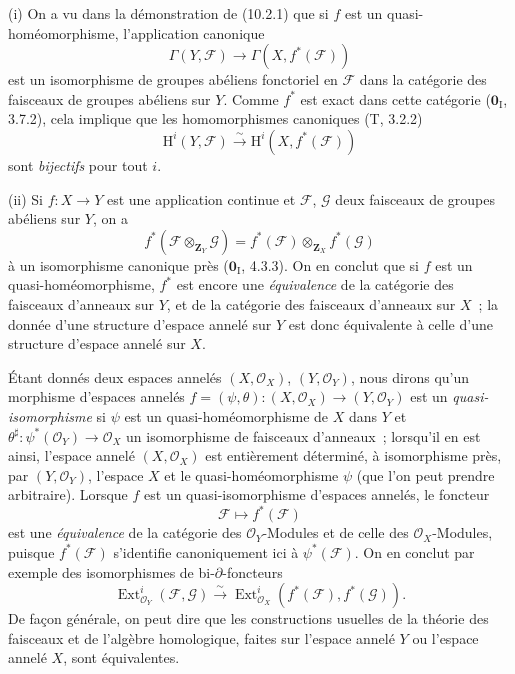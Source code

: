 \begin{remarks}[10.2.8]
\label{IV.10.2.8-fr}
\upshape (i) On a vu dans la démonstration de (10.2.1) que si $f$ est un
quasi-homéomorphisme, l'application canonique
\begin{equation}
\label{IV.10.2.8.1-fr}
\tag{10.2.8.1}
\Gamma(Y,\mathcal F)\to\Gamma(X,f^*(\mathcal F))
\end{equation}
est un isomorphisme de groupes abéliens fonctoriel en $\mathcal F$ dans la
catégorie des faisceaux de groupes abéliens sur $Y$. Comme $f^*$ est exact
dans cette catégorie ($\mathbf 0_{\mathrm I}$, 3.7.2), cela implique que les
homomorphismes canoniques (T, 3.2.2)
\[
\mathrm H^i(Y,\mathcal F)\xrightarrow{\sim}
\mathrm H^i(X,f^*(\mathcal F))
\]
sont \emph{bijectifs} pour tout $i$.

(ii) Si $f:X\to Y$ est une application continue et $\mathcal F$,
$\mathcal G$ deux faisceaux de groupes abéliens sur $Y$, on a
\[
f^*(\mathcal F\otimes_{\mathbf Z_Y}\mathcal G)
=f^*(\mathcal F)\otimes_{\mathbf Z_X}f^*(\mathcal G)
\]
à un isomorphisme canonique près ($\mathbf 0_{\mathrm I}$, 4.3.3). On en
conclut que si $f$ est un quasi-homéomorphisme, $f^*$ est encore une
\emph{équivalence} de la catégorie des faisceaux d'anneaux sur $Y$, et de la
catégorie des faisceaux d'anneaux sur $X$~; la donnée d'une structure d'espace
annelé sur $Y$ est donc équivalente à celle d'une structure d'espace annelé
sur $X$.

Étant donnés deux espaces annelés $(X,\mathcal O_X)$, $(Y,\mathcal O_Y)$, nous
dirons qu'un morphisme d'espaces annelés
$f=(\psi,\theta):(X,\mathcal O_X)\to(Y,\mathcal O_Y)$ est un
\emph{quasi-isomorphisme} si $\psi$ est un quasi-homéomorphisme de $X$ dans
$Y$ et $\theta^\sharp:\psi^*(\mathcal O_Y)\to\mathcal O_X$ un isomorphisme de
faisceaux d'anneaux~; lorsqu'il en est ainsi, l'espace annelé
$(X,\mathcal O_X)$ est entièrement déterminé, à isomorphisme près, par
$(Y,\mathcal O_Y)$, l'espace $X$ et le quasi-homéomorphisme $\psi$ (que l'on
peut prendre arbitraire). Lorsque $f$ est un quasi-isomorphisme d'espaces
annelés, le foncteur
\[
\mathcal F\mapsto f^*(\mathcal F)
\]
est une \emph{équivalence} de la catégorie des $\mathcal O_Y$-Modules et de
celle des $\mathcal O_X$-Modules, puisque $f^*(\mathcal F)$ s'identifie
canoniquement ici à $\psi^*(\mathcal F)$. On en conclut par exemple des
isomorphismes de bi-$\partial$-foncteurs
\[
\operatorname{Ext}^i_{\mathcal O_Y}(\mathcal F,\mathcal G)
\xrightarrow{\sim}
\operatorname{Ext}^i_{\mathcal O_X}(f^*(\mathcal F),f^*(\mathcal G)).
\]
De façon générale, on peut dire que les constructions usuelles de la théorie
des faisceaux et de l'algèbre homologique, faites sur l'espace annelé $Y$ ou
l'espace annelé $X$, sont équivalentes.
\end{remarks}

